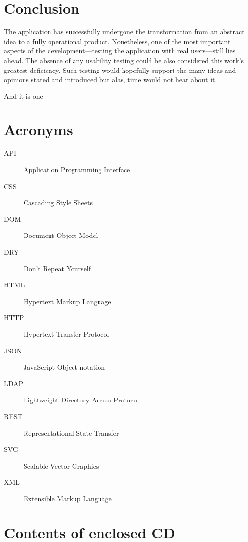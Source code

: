 \documentclass[thesis=M,english,hidelinks]{FITthesis}[2012/10/20]
\begin{document}
\chapter{Conclusion}

The application has successfully undergone the transformation from an abstract idea to a fully operational product. Nonetheless, one of the most important aspects of the development---testing the application with real users---still lies ahead. The absence of any usability testing could be also considered this work's greatest deficiency. Such testing would hopefully support the many ideas and opinions stated and introduced but alas, time would not hear about it.

And it is one





\appendix

\chapter{Acronyms}

\begin{description}
  \item[API] Application Programming Interface
  \item[CSS] Cascading Style Sheets
  \item[DOM] Document Object Model
  \item[DRY] Don't Repeat Yourself
  \item[HTML] Hypertext Markup Language
  \item[HTTP] Hypertext Transfer Protocol
  \item[JSON] JavaScript Object notation
  \item[LDAP] Lightweight Directory Access Protocol
  \item[REST] Representational State Transfer
  \item[SVG] Scalable Vector Graphics
  \item[XML] Extensible Markup Language
\end{description}


\chapter{Contents of enclosed CD}

\begin{figure}
\end{figure}
\end{document}
